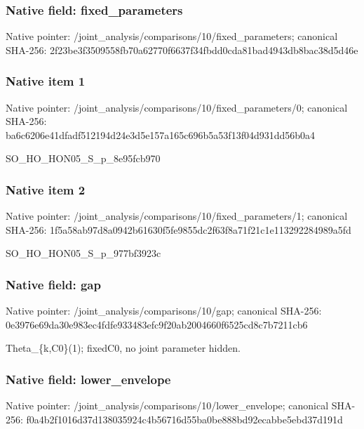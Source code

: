 \documentclass[10pt,a4paper]{article}
\begin{document}
\subsubsection{Native field: fixed\_\allowbreak{}parameters}
Native pointer: /joint\_\allowbreak{}analysis/comparisons/10/fixed\_\allowbreak{}parameters; canonical SHA-256: 2f23be3f3509558fb70a62770f6637f34fbdd0cda81bad4943db8bac38d5d46e

\subsubsection{Native item 1}
Native pointer: /joint\_\allowbreak{}analysis/comparisons/10/fixed\_\allowbreak{}parameters/0; canonical SHA-256: ba6c6206e41dfadf512194d24e3d5e157a165c696b5a53f13f04d931dd56b0a4

\begingroup\raggedright\sloppy SO\_\allowbreak{}HO\_\allowbreak{}HON05\_\allowbreak{}S\_\allowbreak{}p\_\allowbreak{}8e95fcb970\par\endgroup

\subsubsection{Native item 2}
Native pointer: /joint\_\allowbreak{}analysis/comparisons/10/fixed\_\allowbreak{}parameters/1; canonical SHA-256: 1f5a58ab97d8a0942b61630f5fe9855dc2f63f8a71f21c1e113292284989a5fd

\begingroup\raggedright\sloppy SO\_\allowbreak{}HO\_\allowbreak{}HON05\_\allowbreak{}S\_\allowbreak{}p\_\allowbreak{}977bf3923c\par\endgroup

\subsubsection{Native field: gap}
Native pointer: /joint\_\allowbreak{}analysis/comparisons/10/gap; canonical SHA-256: 0e3976e69da30e983ec4fdfe933483efc9f20ab2004660f6525cd8c7b7211cb6

\begingroup\raggedright\sloppy Theta\_\allowbreak{}\{k,\allowbreak{}C0\}(1);\allowbreak{} fixedC0,\allowbreak{} no joint parameter hidden.\par\endgroup

\subsubsection{Native field: lower\_\allowbreak{}envelope}
Native pointer: /joint\_\allowbreak{}analysis/comparisons/10/lower\_\allowbreak{}envelope; canonical SHA-256: f0a4b2f1016d37d138035924c4b56716d55ba0be888bd92ecabbe5ebd37d191d
\end{document}
